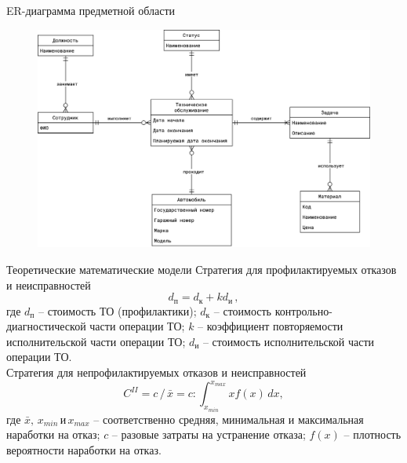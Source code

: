 \documentclass{beamer}
\begin{document}
\begin{frame}
	{ER-диаграмма предметной области}
    \begin{figure}[h]
        \centering
        \includegraphics[keepaspectratio,width=\textwidth]{2/images/er-2.png}
        \label{fig:er-diagram}
    \end{figure}
\end{frame}

\begin{frame}
	{Теоретические математические модели}
    Стратегия для профилактируемых отказов и неисправностей
    \begin{equation*}
        d_{\text{п}} = d_{\text{к}} + k d_{\text{и}}\,,
    \end{equation*}
    {\footnotesize
        где $d_{\text{п}}$ -- стоимость ТО (профилактики); $d_{\text{к}}$ --
        стоимость контрольно-диагностической части операции ТО; $k$ --
        коэффициент повторяемости исполнительской части операции ТО;
        $d_{\text{и}}$ -- стоимость исполнительской части операции ТО.
    }
    \\[\baselineskip]
    Стратегия для непрофилактируемых отказов и неисправностей
    \begin{equation*}
        C^{II} =
        c\,/\,\bar{x} =
        c : \int_{x_{min}}^{x_{max}} x f(x)\,dx,
    \end{equation*}
    {\footnotesize
        где $\bar{x},\,x_{min} \,\text{и} \,x_{max}$ -- соответственно средняя,
        минимальная и максимальная наработки на отказ; $c$ -- разовые затраты на
        устранение отказа; $f(x)$ -- плотность вероятности наработки на отказ.
    }
\end{frame}
\end{document}
